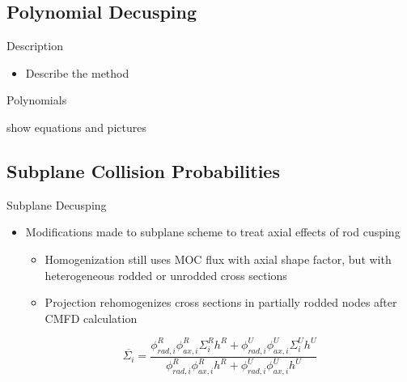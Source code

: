 \subsection{Polynomial Decusping}
\begin{frame}[t]{Description}

\begin{itemize}
    \item Describe the method
\end{itemize}

\end{frame}


\begin{frame}[t]{Polynomials}
    
    show equations and pictures
    
\end{frame}


\subsection{Subplane Collision Probabilities}

\begin{frame}[t]{Subplane Decusping}
    
    \begin{itemize}
        \item Modifications made to subplane scheme \cite{Graham2017Improvementofthe2D/1DMethodUsingtheSub-PlaneScheme,Graham2017RodDecuspingTechniquesforthe2D/1DMethod} to treat axial effects of rod cusping
        \begin{itemize}
            \item Homogenization still uses MOC flux with axial shape factor, but 
            with heterogeneous rodded or unrodded cross sections
            \item Projection rehomogenizes cross sections in partially rodded nodes 
            after CMFD calculation
        \end{itemize}
        \begin{equation}\label{e:nTRACERdecusping}
        \overline{\Sigma_i} = \frac{\phi_{rad,i}^R \phi_{ax,i}^R \Sigma_i^R h^R + \phi_{rad,i}^U \phi_{ax,i}^U \Sigma_i^U h^U}{\phi_{rad,i}^R \phi_{ax,i}^R h^R + \phi_{rad,i}^U \phi_{ax,i}^U h^U} \nonumber
        \end{equation}
    \end{itemize}
    
\end{frame}

